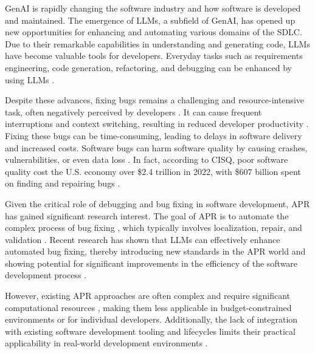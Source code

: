 \ac{GenAI} is rapidly changing the software industry and how software is developed and maintained. The emergence of \acp{LLM}, a subfield of \ac{GenAI}, has opened up new opportunities for enhancing and automating various domains of the \ac{SDLC}. Due to their remarkable capabilities in understanding and generating code, \acp{LLM} have become valuable tools for developers. Everyday tasks such as requirements engineering, code generation, refactoring, and debugging can be enhanced by using \acp{LLM} \cite{houLargeLanguageModels2024, puvvadiCodingAgentsComprehensive2025}.

Despite these advances, fixing bugs remains a challenging and resource-intensive task, often negatively perceived by developers \cite{winterHowDevelopersReally2023}. It can cause frequent interruptions and context switching, resulting in reduced developer productivity \cite{vasilescuSkyNotLimit2016}. Fixing these bugs can be time-consuming, leading to delays in software delivery and increased costs. %
Software bugs can harm software quality by causing crashes, vulnerabilities, or even data loss \cite{tihanyiNewEraSoftware2024}. In fact, according to CISQ, poor software quality cost the U.S. economy over \$2.4 trillion in 2022, with \$607 billion spent on finding and repairing bugs \cite{CostPoorSoftware}.

Given the critical role of debugging and bug fixing in software development, \ac{APR} has gained significant research interest. The goal of APR is to automate the complex process of bug fixing \cite{houLargeLanguageModels2024}, which typically involves localization, repair, and validation \cite{zhangEmpiricalStudyFactors2012, leeUnifiedDebuggingApproach2024, xiaAgentlessDemystifyingLLMbased2024, zhangPATCHEmpoweringLarge2025, wangEmpiricalResearchUtilizing2025}. Recent research has shown that \acp{LLM} can effectively enhance automated bug fixing, thereby introducing new standards in the APR world and showing potential for significant improvements in the efficiency of the software development process \cite{xiaAgentlessDemystifyingLLMbased2024, liuMarsCodeAgentAInative2024, yangSWEagentAgentComputerInterfaces2024, sobaniaAnalysisAutomaticBug2023, xiaAutomatedProgramRepair2024, huCanGPTO1Kill2024}.

However, existing APR approaches are often complex and require significant computational resources \cite{rondonEvaluatingAgentbasedProgram2025}, making them less applicable in budget-constrained environments or for individual developers. Additionally, the lack of integration with existing software development tooling and lifecycles limits their practical applicability in real-world development environments \cite{chenUnveilingPitfallsUnderstanding2025, liuMarsCodeAgentAInative2024}.

